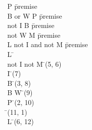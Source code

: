 \documentclass{article}
\begin{document}
\begin{proofbox}
\: \lnot P \= \hbox{premise} \\
\: B or W \rightarrow P \= \hbox{premise} \\
\: not I \rightarrow B \= \hbox{premise} \\
\: not W \rightarrow M \= \hbox{premise} \\
\: L \rightarrow not I and not M \= \hbox{premise} \\
\open
\: L \= \asm \\
\: not I \land not M \= \implieselim(5, 6) \\
\: \lnot I \= \andelim(7) \\
\: B \= \implieselim(3, 8) \\
\: B \lor W \= \orintro(9) \\
\: P \= \implieselim(2, 10) \\
\: \bot \= \bottomintro(11, 1) \\
\close
\: \lnot L \= \notintro(6, 12) \\
\end{proofbox}
\end{document}
